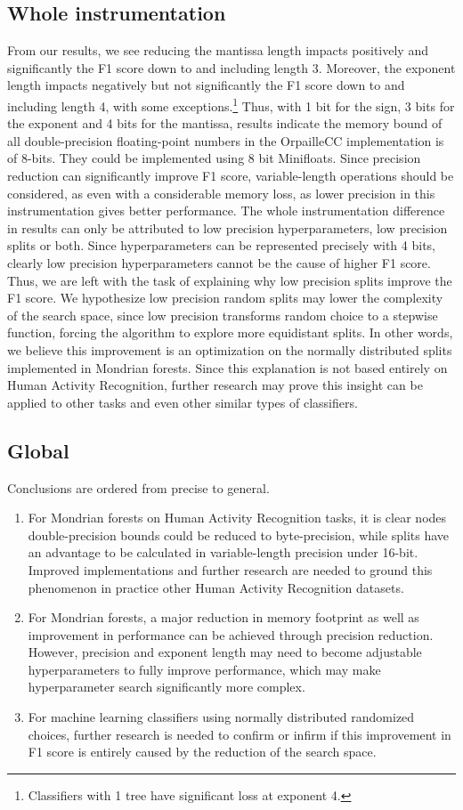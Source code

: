 \documentclass[conference]{IEEEtran}
\begin{document}
\subsection{Whole instrumentation}
From our results, we see reducing the mantissa length impacts positively and significantly the F1 score down to and including length 3. Moreover, the exponent length impacts negatively but not significantly the F1 score down to and including length 4, with some exceptions.\footnote{Classifiers with 1 tree have significant loss at exponent 4.} Thus, with 1 bit for the sign, 3 bits for the exponent and 4 bits for the mantissa, results indicate the memory bound of all double-precision floating-point numbers in the OrpailleCC implementation is of 8-bits. They could be implemented using 8 bit Minifloats. Since precision reduction can significantly improve F1 score, variable-length operations should be considered, as even with a considerable memory loss, as lower precision in this instrumentation gives better performance.
The whole instrumentation difference in results can only be attributed to low precision hyperparameters, low precision splits or both. Since hyperparameters can be represented precisely with 4 bits, clearly low precision hyperparameters cannot be the cause of higher F1 score. Thus, we are left with the task of explaining why low precision splits improve the F1 score. We hypothesize low precision random splits may lower the complexity of the search space, since low precision transforms random choice to a stepwise function, forcing the algorithm to explore more equidistant splits. In other words, we believe this improvement is an optimization on the normally distributed splits implemented in Mondrian forests. Since this explanation is not based entirely on Human Activity Recognition, further research may prove this insight can be applied to other tasks and even other similar types of classifiers.
\subsection{Global}
Conclusions are ordered from precise to general.
\begin{enumerate}
\item For Mondrian forests on Human Activity Recognition tasks, it is clear nodes double-precision bounds could be reduced to byte-precision, while splits have an advantage to be calculated in variable-length precision under 16-bit. Improved implementations and further research are needed to ground this phenomenon in practice other Human Activity Recognition datasets.
\item For Mondrian forests, a major reduction in memory footprint as well as improvement in performance can be achieved through precision reduction. However, precision and exponent length may need to become adjustable hyperparameters to fully improve performance, which may make hyperparameter search significantly more complex.
\item For machine learning classifiers using normally distributed randomized choices, further research is needed to confirm or infirm if this improvement in F1 score is entirely caused by the reduction of the search space.
\end{enumerate}
\end{document}
